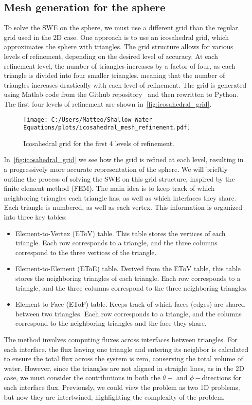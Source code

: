 \subsection*{Mesh generation for the sphere}
To solve the SWE on the sphere, we must use a different grid than the regular grid used in the 2D case.
One approach is to use an icosahedral grid, which approximates the sphere with triangles.
The grid structure allows for various levels of refinement, depending on the desired level of accuracy.
At each refinement level, the number of triangles increases by a factor of four, as each triangle is divided into four smaller triangles, meaning that the number of triangles increases drastically with each level of refinement.
The grid is generated using Matlab code from the Github repository~\cite{sphere_mesh_triangles} and then rewritten to Python.
The first four levels of refinement are shown in~\autoref{fig:icosahedral_grid}.
\begin{figure}[H]
    \centering
    \texttt{[image: C:/Users/Matteo/Shallow-Water-Equations/plots/icosahedral\_mesh\_refinement.pdf]}
    \caption{Icosahedral grid for the first 4 levels of refinement.}\label{fig:icosahedral_grid}
\end{figure}
In~\autoref{fig:icosahedral_grid} we see how the grid is refined at each level, resulting in a progressively more accurate representation of the sphere.
We will brieftly outline the process of solving the SWE on this grid structure, inspired by the finite element method (FEM).
The main idea is to keep track of which neighboring triangles each triangle has, as well as which interfaces they share.
Each triangle is numbered, as well as each vertex.
This information is organized into three key tables:
\begin{itemize}
    \item Element-to-Vertex (EToV) table. This table stores the vertices of each triangle.
    Each row corresponds to a triangle, and the three columns correspond to the three vertices of the triangle.
    \item Element-to-Element (EToE) table. Derived from the EToV table, this table stores the neighboring triangles of each triangle.
    Each row corresponds to a triangle, and the three columns correspond to the three neighboring triangles. 
    \item Element-to-Face (EToF) table. Keeps track of which faces (edges) are shared between two triangles.
    Each row corresponds to a triangle, and the columns correspond to the neighboring triangles and the face they share.
\end{itemize}
The method involves computing fluxes across interfaces between triangles.
For each interface, the flux leaving one triangle and entering its neighbor is calculated to ensure the total flux across the system is zero, conserving the total volume of water.
However, since the triangles are not aligned in straight lines, as in the 2D case, we must consider the contributions in both the $\theta-$ and $\phi-$directions for each interface flux.
Previously, we could view the problem as two 1D problems, but now they are intertwined, highlighting the complexity of the problem.

